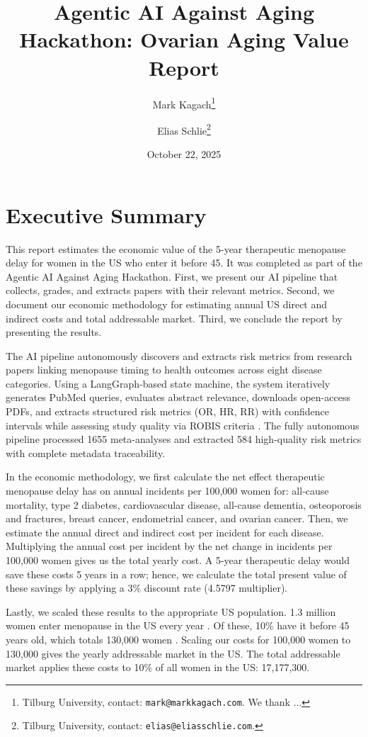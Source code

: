 \documentclass[12pt]{article}
\title{\textbf{Agentic AI Against Aging Hackathon: Ovarian Aging Value Report}}
\author{
  Mark Kagach\footnote{Tilburg University, contact: \texttt{mark@markkagach.com}. We thank ...}
  \and
  Elias Schlie\footnote{Tilburg University, contact: \texttt{elias@eliasschlie.com}. }
}
\date{October 22, 2025}
\begin{document}
\maketitle
\newpage

\section{Executive Summary}
This report estimates the economic value of the 5-year therapeutic menopause delay for women in the US who enter it before 45. It was completed as part of the Agentic AI Against Aging Hackathon. First, we present our AI pipeline that collects, grades, and extracts papers with their relevant metrics. Second, we document our economic methodology for estimating annual US direct and indirect costs and total addressable market. Third, we conclude the report by presenting the results.

The AI pipeline autonomously discovers and extracts risk metrics from research papers linking menopause timing to health outcomes across eight disease categories. Using a LangGraph-based state machine, the system iteratively generates PubMed queries, evaluates abstract relevance, downloads open-access PDFs, and extracts structured risk metrics (OR, HR, RR) with confidence intervals while assessing study quality via ROBIS criteria \parencite{whitingROBISNewTool2016}. The fully autonomous pipeline processed 1655 meta-analyses and extracted 584 high-quality risk metrics with complete metadata traceability.

In the economic methodology, we first calculate the net effect therapeutic menopause delay has on annual incidents per 100,000 women for: all-cause mortality, type 2 diabetes, cardiovascular disease, all-cause dementia, osteoporosis and fractures, breast cancer, endometrial cancer, and ovarian cancer. Then, we estimate the annual direct and indirect cost per incident for each disease. Multiplying the annual cost per incident by the net change in incidents per 100,000 women gives us the total yearly cost. A 5-year therapeutic delay would save these costs 5 years in a row; hence, we calculate the total present value of these savings by applying a 3\% discount rate (4.5797 multiplier). 

Lastly, we scaled these results to the appropriate US population. 1.3 million women enter menopause in the US every year \parencite{PeacockMenopauseStatPearls2023}. Of these, 10\% have it before 45 years old, which totals 130,000 women \parencite{Anagnostis2025EarlyMenopause}. Scaling our costs for 100,000 women to 130,000 gives the yearly addressable market in the US. The total addressable market applies these costs to 10\% of all women in the US: 17,177,300.
\end{document}
